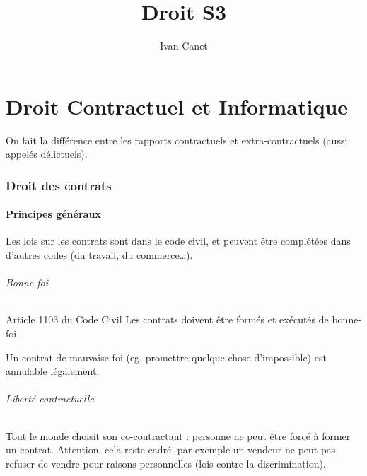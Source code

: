\documentclass[10pt,a4paper,french]{article}
\begin{document}
\title{Droit S3}
\author{Ivan Canet}
\maketitle


\tableofcontents

\part{Droit Contractuel et Informatique}

On fait la différence entre les rapports contractuels et extra-contractuels (aussi appelés délictuels).

\section{Droit des contrats}

\subsection{Principes généraux}

Les lois sur les contrats sont dans le code civil, et peuvent être complétées dans d'autres codes (du travail, du commerce\ldots).

\paragraph{Bonne-foi}

\begin{cquote}{Article 1103 du Code Civil}
Les contrats doivent être formés et exécutés de bonne-foi.
\end{cquote}

Un contrat de mauvaise foi (eg. promettre quelque chose d'impossible) est annulable légalement.

\paragraph{Liberté contractuelle}
Tout le monde choisit son co-contractant : personne ne peut être forcé à former un contrat. Attention, cela reste cadré, par exemple un vendeur ne peut pas refuser de vendre pour raisons personnelles (lois contre la discrimination).
\end{document}
